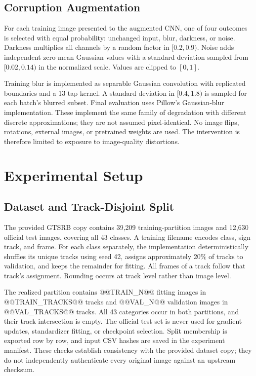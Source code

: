 \documentclass[conference]{IEEEtran}
\begin{document}
\subsection{Corruption Augmentation}
For each training image presented to the augmented CNN, one of four outcomes is selected with equal probability: unchanged input, blur, darkness, or noise. Darkness multiplies all channels by a random factor in $[0.2,0.9)$. Noise adds independent zero-mean Gaussian values with a standard deviation sampled from $[0.02,0.14)$ in the normalized scale. Values are clipped to $[0,1]$.

Training blur is implemented as separable Gaussian convolution with replicated boundaries and a 13-tap kernel. A standard deviation in $[0.4,1.8)$ is sampled for each batch's blurred subset. Final evaluation uses Pillow's Gaussian-blur implementation. These implement the same family of degradation with different discrete approximations; they are not assumed pixel-identical. No image flips, rotations, external images, or pretrained weights are used. The intervention is therefore limited to exposure to image-quality distortions.

\section{Experimental Setup}
\subsection{Dataset and Track-Disjoint Split}
The provided GTSRB copy contains 39,209 training-partition images and 12,630 official test images, covering all 43 classes. A training filename encodes class, sign track, and frame. For each class separately, the implementation deterministically shuffles its unique tracks using seed 42, assigns approximately 20\% of tracks to validation, and keeps the remainder for fitting. All frames of a track follow that track's assignment. Rounding occurs at track level rather than image level.

The realized partition contains @@TRAIN_N@@ fitting images in @@TRAIN_TRACKS@@ tracks and @@VAL_N@@ validation images in @@VAL_TRACKS@@ tracks. All 43 categories occur in both partitions, and their track intersection is empty. The official test set is never used for gradient updates, standardizer fitting, or checkpoint selection. Split membership is exported row by row, and input CSV hashes are saved in the experiment manifest. These checks establish consistency with the provided dataset copy; they do not independently authenticate every original image against an upstream checksum.
\end{document}
